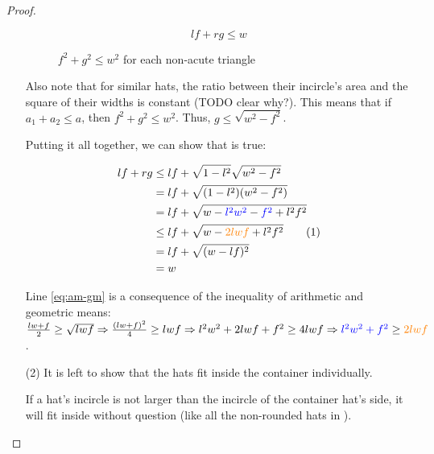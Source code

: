 \documentclass[a4paper,style=print,bibliography=totoc,nexus,lnum,extramargin]{tubsbook}
\begin{document}
\begin{proof}
\begin{itemize}
            \begin{equation}\label{eq:trifit}
                lf + rg \le w
            \end{equation}

            \begin{figure}

                \caption{$f^2 + g^2 \le w^2$ for each non-acute triangle}
                \label{fig:hatsoverlap}
            \end{figure}

            Also note that for similar hats, the ratio between their incircle's area and the square of their widths is constant (TODO clear why?). This means that if $a_1 + a_2 \le a$, then $f^2 + g^2 \le w^2$. Thus, $g \le \sqrt{w^2-f^2}$.

            Putting it all together, we can show that  is true:

            \begin{align*}
                lf + rg
                &\le lf + \sqrt{1-l^2} \sqrt{w^2-f^2}\\
                &= lf + \sqrt{(1-l^2)(w^2-f^2)}\\
                &= lf + \sqrt{w - \textcolor{blue}{l^2w^2} - \textcolor{blue}{f^2} + l^2f^2}\\
                &\le lf + \sqrt{w - \textcolor{orange}{2lwf} + l^2f^2}\addtocounter{equation}{1}\tag{\theequation}\label{eq:am-gm}\\
                &= lf + \sqrt{(w-lf)^2}\\
                &= w
            \end{align*}

            Line \ref{eq:am-gm} is a consequence of the inequality of arithmetic and geometric means: $\frac{lw+f}{2} \ge \sqrt{lwf} \Rightarrow \frac{(lw+f)^2}{4} \ge lwf \Rightarrow l^2w^2 + 2 lwf + f^2 \ge 4 lwf \Rightarrow \textcolor{blue}{l^2w^2 + f^2} \ge \textcolor{orange}{2lwf}$.

        \item[(2)]
            It is left to show that the hats fit inside the container individually.

            If a hat's incircle is not larger than the incircle of the container hat's side, it will fit inside without question (like all the non-rounded hats in ).


\end{itemize}
\end{proof}
\end{document}
